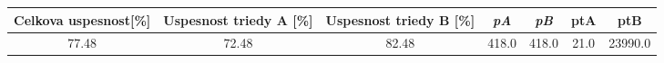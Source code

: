 \documentclass[a4paper,twoside,	12pt]{article}
\begin{document}
\begin{landscape} 
\begin{tiny}

  \begin{table}[!h]
\begin{tabular}{|c|c|c|c|c|c|c|}
\toprule
\rowcolor[rgb]{0.8,0.8,0.8}	
 \textbf{Celkova uspesnost[\%]} & \textbf{Uspesnost triedy A [\%]}  &
 \textbf{Uspesnost triedy B [\%]}  & \textit{pA} & \textit{pB} & \textbf{ptA} & \textbf{ptB}\\
\midrule 		
     77.48 & 72.48 & 82.48 & 418.0 & 418.0 & 21.0 & 23990.0 \\
   \end{tabular}
 \end{table}

\end{tiny}
\end{landscape}
\end{document}
